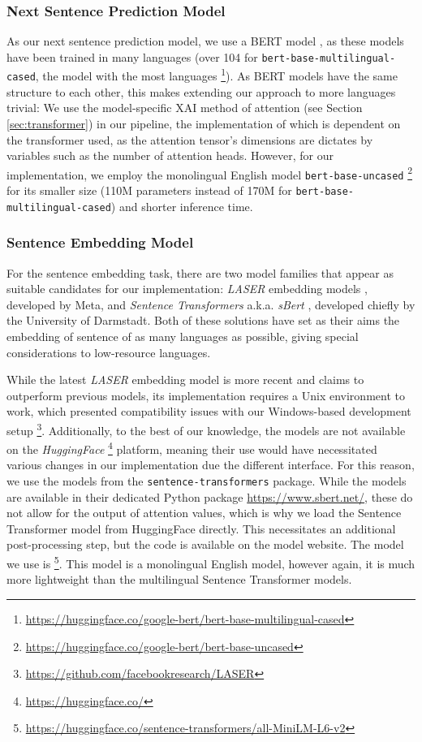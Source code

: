 \subsubsection{Next Sentence Prediction Model}
As our next sentence prediction model, we use a BERT model \cite{kentonBertPretrainingDeep2019}, as these models have been trained in many languages (over 104 for \texttt{bert-base-multilingual-cased}, the model with the most languages \footnote{\url{https://huggingface.co/google-bert/bert-base-multilingual-cased}}).
As BERT models have the same structure to each other, this makes extending our approach to more languages trivial:
We use the model-specific XAI method of attention (see Section \ref{sec:transformer}) in our pipeline, the implementation of which is dependent on the transformer used, as the attention tensor's dimensions are dictates by variables such as the number of attention heads.
However, for our implementation, we employ the monolingual English model \texttt{bert-base-uncased} \footnote{\url{https://huggingface.co/google-bert/bert-base-uncased}} for its smaller size (110M parameters instead of 170M for \texttt{bert-base-multilingual-cased}) and shorter inference time.


\subsubsection{Sentence Embedding Model}
For the sentence embedding task, there are two model families that appear as suitable candidates for our implementation:
\textit{LASER} embedding models \cite{artetxeMassivelyMultilingualSentence2019}, developed by Meta, and \textit{Sentence Transformers} a.k.a. \textit{sBert} \cite{reimersMakingMonolingualSentence2020}, developed chiefly by the University of Darmstadt.
Both of these solutions have set as their aims the embedding of sentence of as many languages as possible, giving special considerations to low-resource languages.

While the latest \textit{LASER} embedding model is more recent and claims to outperform previous models, its implementation requires a Unix environment to work, which presented compatibility issues with our Windows-based development setup \footnote{\url{https://github.com/facebookresearch/LASER}}.
Additionally, to the best of our knowledge, the models are not available on the \textit{HuggingFace} \footnote{\url{https://huggingface.co/}} platform, meaning their use would have necessitated various changes in our implementation due the different interface.
For this reason, we use the models from the \texttt{sentence-transformers} package.
While the models are available in their dedicated Python package \url{https://www.sbert.net/}, these do not allow for the output of attention values, which is why we load the Sentence Transformer model from HuggingFace directly.
This necessitates an additional post-processing step, but the code is available on the model website.
The model we use is \footnote{\url{https://huggingface.co/sentence-transformers/all-MiniLM-L6-v2}}.
This model is a monolingual English model, however again, it is much more lightweight than the multilingual Sentence Transformer models.



